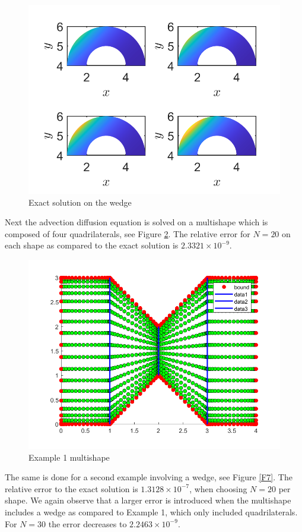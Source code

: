 \documentclass[11pt, a4paper]{article}
\theoremstyle{definition}
\begin{document}
\begin{figure}[h]
	\centering
	\includegraphics[scale=0.5]{disectW2.png}
	\caption{Exact solution on the wedge} 
	\label{F5}
\end{figure}

Next the advection diffusion equation is solved on a multishape which is composed of four quadrilaterals, see Figure \ref{F6}. The relative error for $N = 20$ on each shape as compared to the exact solution is $2.3321 \times 10^{-9}$. 
\begin{figure}[h]
	\centering
	\includegraphics[scale=0.5]{example1.png}
	\caption{Example 1 multishape} 
	\label{F6}
\end{figure}
The same is done for a second example involving a wedge, see Figure \ref{F7}. The relative error to the exact solution is $1.3128 \times 10^{-7}$, when choosing $N= 20$ per shape. We again observe that a larger error is introduced when the multishape includes a wedge as compared to Example 1, which only included quadrilaterals. For $N = 30$ the error decreases to $2.2463 \times 10^{-9}$.
\end{document}
